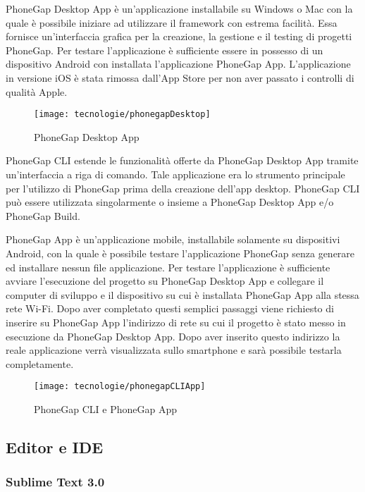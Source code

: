 PhoneGap Desktop App è un'applicazione installabile su Windows o Mac con la quale è possibile iniziare ad utilizzare il framework con estrema facilità. Essa fornisce un'interfaccia grafica per la creazione, la gestione e il testing di progetti PhoneGap. Per testare l'applicazione è sufficiente essere in possesso di un dispositivo Android con installata l'applicazione PhoneGap App. L'applicazione in versione iOS è stata rimossa dall'App Store per non aver passato i controlli di qualità Apple.

\begin{figure}[!h] 
    \centering 
    \texttt{[image: tecnologie/phonegapDesktop]} 
    \caption{PhoneGap Desktop App}
\end{figure}

\newpage

PhoneGap CLI estende le funzionalità offerte da PhoneGap Desktop App tramite un'interfaccia a riga di comando. Tale applicazione era lo strumento principale per l'utilizzo di PhoneGap prima della creazione dell'app desktop. PhoneGap CLI può essere utilizzata singolarmente o insieme a PhoneGap Desktop App e/o PhoneGap Build.

PhoneGap App è un'applicazione mobile, installabile solamente su dispositivi Android, con la quale è possibile testare l'applicazione PhoneGap senza generare ed installare nessun file applicazione. Per testare l'applicazione è sufficiente avviare l'esecuzione del progetto su PhoneGap Desktop App e collegare il computer di sviluppo e il dispositivo su cui è installata PhoneGap App alla stessa rete Wi-Fi. Dopo aver completato questi semplici passaggi viene richiesto di inserire su PhoneGap App l'indirizzo di rete su cui il progetto è stato messo in esecuzione da PhoneGap Desktop App. Dopo aver inserito questo indirizzo la reale applicazione verrà visualizzata sullo smartphone e sarà possibile testarla completamente.

\begin{figure}[!h] 
    \centering 
    \texttt{[image: tecnologie/phonegapCLIApp]} 
    \caption{PhoneGap CLI e PhoneGap App}
\end{figure}

\subsection{Editor e IDE}

\subsubsection{Sublime Text 3.0}

